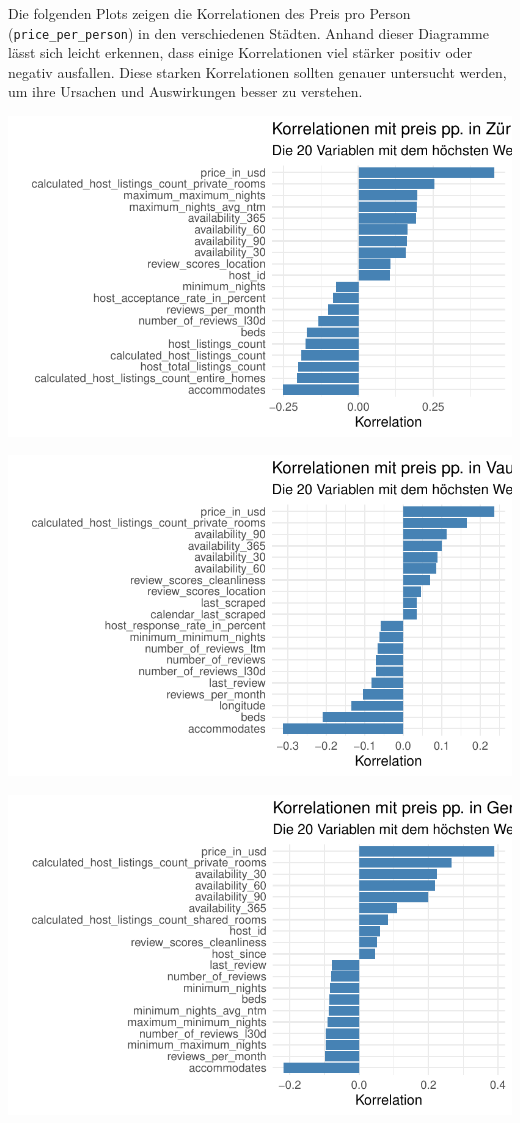 \documentclass[
  journal,
]{IEEEtran}%
\begin{document}
Die folgenden Plots zeigen die Korrelationen des Preis pro Person
(\texttt{price\_per\_person}) in den verschiedenen Städten. Anhand
dieser Diagramme lässt sich leicht erkennen, dass einige Korrelationen
viel stärker positiv oder negativ ausfallen. Diese starken Korrelationen
sollten genauer untersucht werden, um ihre Ursachen und Auswirkungen
besser zu verstehen.

\includegraphics{main_files/figure-pdf/unnamed-chunk-11-1.pdf}

\includegraphics{main_files/figure-pdf/unnamed-chunk-11-2.pdf}

\includegraphics{main_files/figure-pdf/unnamed-chunk-11-3.pdf}
\end{document}
